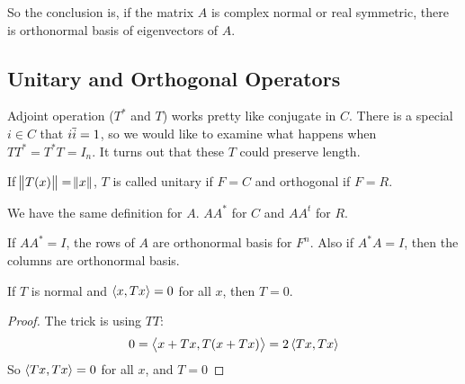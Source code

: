 So the conclusion is, if the matrix $A$ is complex normal or real symmetric, there is orthonormal basis of eigenvectors of $A$.

\subsection{Unitary and Orthogonal Operators}

Adjoint operation ($T^*$ and $T$) works pretty like conjugate in $C$. There is a special $i \in C$  that $i \overline{i} = 1$, so we would like to examine what happens when $TT^* = T^* T = I_n$. It turns out that these $T$ could preserve length.

\begin{definition}
    If $\norm{T(x)} = \norm{x}$, $T$ is called unitary if $F=C$ and orthogonal if $F=R$.
\end{definition}

We have the same definition for $A$. $AA^*$ for $C$ and $AA^t$ for $R$.

If $AA^* = I$, the rows of $A$ are orthonormal basis for $F^n$. Also if $A^*A = I$, then the columns are orthonormal basis.


\begin{theorem}\label{normal_zero_operator}
    If $T$ is normal and $\left\langle \displaystyle x, Tx \right\rangle = 0$ for all $x$, then $T=0$.
\end{theorem}
\begin{proof}
    The trick is using $TT$:
    \begin{equation*}
        0 = \left\langle \displaystyle x + Tx, T(x + Tx) \right\rangle = 2 \left\langle \displaystyle Tx, Tx \right\rangle
    \end{equation*}
    So $\left\langle \displaystyle Tx, Tx \right\rangle = 0$ for all $x$, and $T = 0$
\end{proof}


